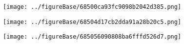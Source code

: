 \documentclass{article}
\begin{document}
\begin{figure} \centering \texttt{[image: ../figureBase/68500ca93fc9098b2042d385.png]} \end{figure}
\begin{figure} \centering \texttt{[image: ../figureBase/68504d17cb2dda91a28b20c5.png]} \end{figure}
\begin{figure} \centering \texttt{[image: ../figureBase/685056090808ba6fffd526d7.png]} \end{figure}
\end{document}
